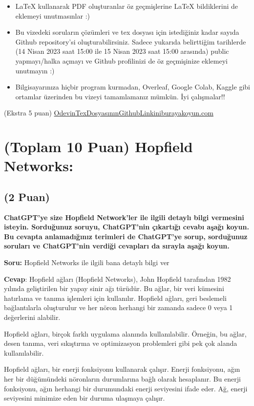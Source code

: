 \documentclass[11pt]{article}
\begin{document}
\begin{itemize}
    \item LaTeX kullanarak PDF oluşturanlar öz geçmişlerine LaTeX bildiklerini de eklemeyi unutmasınlar :)
    \item Bu vizedeki soruların çözümleri ve tex dosyası için istediğiniz kadar sayıda Github repository'si oluşturabilirsiniz. Sadece yukarıda belirttiğim tarihlerde (14 Nisan 2023 saat 15:00 ile 15 Nisan 2023 saat 15:00 arasında) public yapmayı/halka açmayı ve Github profilinizi de öz geçmişinize eklemeyi unutmayın :)
    \item Bilgisayarınıza hiçbir program kurmadan, Overleaf, Google Colab, Kaggle gibi ortamlar üzerinden bu vizeyi tamamlamanız mümkün. İyi çalışmalar!!
\end{itemize}

(Ekstra 5 puan) \url{OdevinTexDosyasınınGithubLinkiniburayakoyun.com}

\newpage
\section{(Toplam 10 Puan) Hopfield Networks:}

\subsection{(2 Puan)} \textbf{ChatGPT’ye size Hopfield Network’ler ile ilgili detaylı bilgi vermesini isteyin. Sorduğunuz soruyu, ChatGPT'nin çıkartığı cevabı aşağı koyun. Bu cevapta anlamadığınız terimleri de ChatGPT’ye sorup, sorduğunuz soruları ve ChatGPT’nin verdiği cevapları da sırayla aşağı koyun.}

\textbf{Soru:} Hopfield Networks ile ilgili bana detaylı bilgi ver

\textbf{Cevap}: Hopfield ağları (Hopfield Networks), John Hopfield tarafından 1982 yılında geliştirilen bir yapay sinir ağı türüdür. Bu ağlar, bir veri kümesini hatırlama ve tanıma işlemleri için kullanılır. Hopfield ağları, geri beslemeli bağlantılarla oluşturulur ve her nöron herhangi bir zamanda sadece 0 veya 1 değerlerini alabilir.

Hopfield ağları, birçok farklı uygulama alanında kullanılabilir. Örneğin, bu ağlar, desen tanıma, veri sıkıştırma ve optimizasyon problemleri gibi pek çok alanda kullanılabilir.

Hopfield ağları, bir enerji fonksiyonu kullanarak çalışır. Enerji fonksiyonu, ağın her bir düğümündeki nöronların durumlarına bağlı olarak hesaplanır. Bu enerji fonksiyonu, ağın herhangi bir durumundaki enerji seviyesini ifade eder. Ağ, enerji seviyesini minimize eden bir duruma ulaşmaya çalışır.
\end{document}
